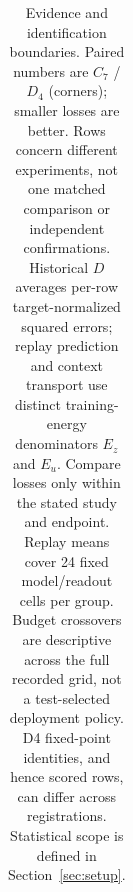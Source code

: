 \begin{table}[t]
\begin{tabular}{@{}p{}p{}p{}@{}}
\bottomrule
\end{tabular}
\caption{Evidence and identification boundaries. Paired numbers are $C_7$ / $D_4$ (corners); smaller losses are better. Rows concern different experiments, not one matched comparison or independent confirmations. Historical $D$ averages per-row target-normalized squared errors; replay prediction and context transport use distinct training-energy denominators $E_z$ and $E_u$. Compare losses only within the stated study and endpoint. Replay means cover 24 fixed model/readout cells per group. Budget crossovers are descriptive across the full recorded grid, not a test-selected deployment policy. D4 fixed-point identities, and hence scored rows, can differ across registrations. Statistical scope is defined in Section~\ref{sec:setup}.}
\label{tab:identification-summary}
\end{table}
